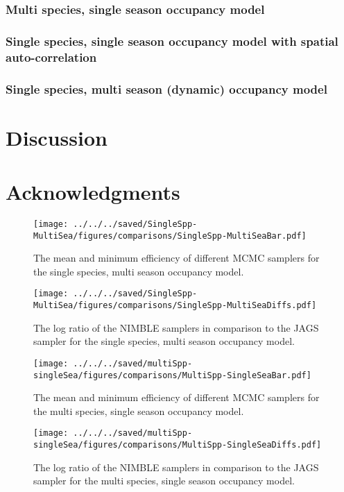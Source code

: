 \documentclass[12pt]{article}
\begin{document}
\subsubsection*{Multi species, single season occupancy model}
\label{sec:msss-res}

\subsubsection*{Single species, single season occupancy model with
  spatial auto-correlation}
\label{sec:sp-res}

\subsubsection*{Single species, multi season (dynamic) occupancy
  model}
\label{sec:ssms-res}

\section*{Discussion}
\label{sec:discussion}

\section*{Acknowledgments}
\label{sec:acknowledge}






\begin{figure}
  \centering
  \texttt{[image: ../../../saved/SingleSpp-MultiSea/figures/comparisons/SingleSpp-MultiSeaBar.pdf]}
  \caption{The mean and minimum efficiency of different MCMC samplers
    for the single species, multi season occupancy model.}
  \label{fig:ss-ms-eff}
\end{figure}
\clearpage


\begin{sidewaysfigure}
  \centering
  \texttt{[image: ../../../saved/SingleSpp-MultiSea/figures/comparisons/SingleSpp-MultiSeaDiffs.pdf]}
  \caption{The log ratio of the NIMBLE samplers in comparison to the
    JAGS sampler for the single species, multi season occupancy
    model.}
  \label{fig:ss-ms-eff}
\end{sidewaysfigure}
\clearpage


\begin{figure}
  \centering
  \texttt{[image: ../../../saved/multiSpp-singleSea/figures/comparisons/MultiSpp-SingleSeaBar.pdf]}
  \caption{The mean and minimum efficiency of different MCMC samplers
    for the multi species, single season occupancy model.}
  \label{fig:ms-ss-eff}
\end{figure}
\clearpage


\begin{sidewaysfigure}
  \centering
  \texttt{[image: ../../../saved/multiSpp-singleSea/figures/comparisons/MultiSpp-SingleSeaDiffs.pdf]}
  \caption{The log ratio of the NIMBLE samplers in comparison to the
    JAGS sampler for the multi species, single season occupancy
    model.}
  \label{fig:ms-ss-eff}
\end{sidewaysfigure}
\clearpage
\end{document}
